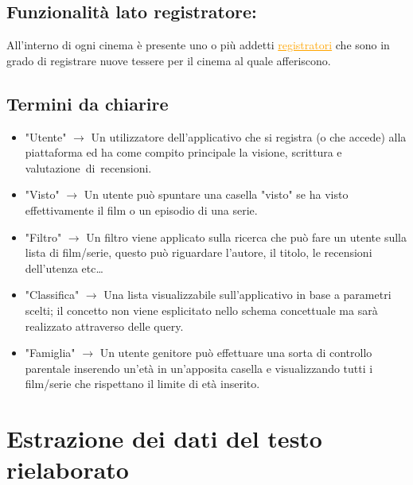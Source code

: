 \documentclass[a4paper,12pt]{report}
\begin{document}
\subsection{Funzionalità lato registratore:}
All'interno di ogni cinema è presente uno o più addetti \textcolor{orange}{\underline{registratori}} che sono in grado di registrare nuove tessere per il cinema al quale afferiscono.

\subsection{Termini da chiarire}\label{ss:terminologia}
\begin{itemize}
	\item "Utente" $\longrightarrow$ Un utilizzatore dell'applicativo che si registra (o che accede) alla piattaforma ed ha come compito principale la visione, scrittura e valutazione di recensioni.
	\item "Visto" $\longrightarrow$ Un utente può spuntare una casella "visto" se ha visto effettivamente il film o un episodio di una serie.
	\item "Filtro" $\longrightarrow$ Un filtro viene applicato sulla ricerca che può fare un utente sulla lista di film/serie, questo può riguardare l'autore, il titolo, le recensioni dell'utenza etc\dots
	\item "Classifica" $\longrightarrow$ Una lista visualizzabile sull'applicativo in base a parametri scelti; il concetto non viene esplicitato nello schema concettuale ma sarà realizzato attraverso delle query.
	\item "Famiglia" $\longrightarrow$ Un utente genitore può effettuare una sorta di controllo parentale inserendo un'età in un'apposita casella e visualizzando tutti i film/serie che rispettano il limite di età inserito.
\end{itemize}
\section{Estrazione dei dati del testo rielaborato}
\end{document}
